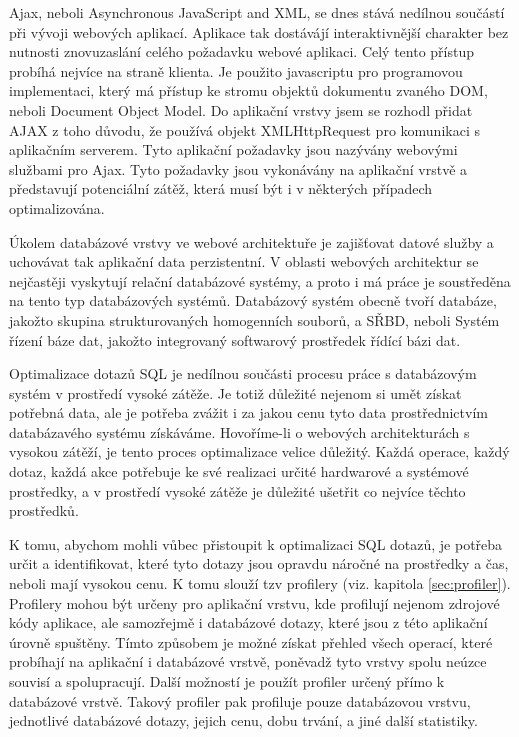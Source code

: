 \documentclass[12pt]{article}
\begin{document}
Ajax, neboli Asynchronous JavaScript and XML, se dnes stává nedílnou součástí při vývoji webových aplikací. Aplikace tak dostávájí interaktivnější charakter bez nutnosti znovuzaslání celého požadavku webové aplikaci. Celý tento přístup probíhá nejvíce na straně klienta. Je použito javascriptu pro programovou implementaci, který má přístup ke stromu objektů dokumentu zvaného DOM, neboli Document Object Model. Do aplikační vrstvy jsem se rozhodl přidat AJAX z toho důvodu, že používá objekt XMLHttpRequest pro komunikaci s aplikačním serverem. Tyto aplikační požadavky jsou nazývány webovými službami pro Ajax. Tyto požadavky jsou vykonávány na aplikační vrstvě a představují potenciální zátěž, která musí být i v některých případech optimalizována.\cite{ajax}




Úkolem databázové vrstvy ve webové architektuře je zajišťovat datové služby a uchovávat tak aplikační data perzistentní. V oblasti webových architektur se nejčastěji vyskytují relační databázové systémy, a proto i má práce je soustředěna na tento typ databázových systémů. Databázový systém obecně tvoří databáze, jakožto skupina strukturovaných homogenních souborů, a SŘBD, neboli Systém řízení báze dat, jakožto integrovaný softwarový prostředek řídící bázi dat.

Optimalizace dotazů SQL je nedílnou součásti procesu práce s databázovým systém v prostředí vysoké zátěže. Je totiž důležité nejenom si umět získat potřebná data, ale je potřeba zvážit i za jakou cenu tyto data prostřednictvím databázavého systému získáváme. Hovoříme-li o webových architekturách s vysokou zátěží, je tento proces optimalizace velice důležitý. Každá operace, každý dotaz, každá akce potřebuje ke své realizaci určité hardwarové a systémové prostředky, a v prostředí vysoké zátěže je důležité ušetřit co nejvíce těchto prostředků.

K tomu, abychom mohli vůbec přistoupit k optimalizaci SQL dotazů, je potřeba určit a identifikovat, které tyto dotazy jsou opravdu náročné na prostředky a čas, neboli mají vysokou cenu. K tomu slouží tzv profilery (viz. kapitola \ref{sec:profiler}). Profilery mohou být určeny pro aplikační vrstvu, kde profilují nejenom zdrojové kódy aplikace, ale samozřejmě i databázové dotazy, které jsou z této aplikační úrovně spuštěny. Tímto způsobem je možné získat přehled všech operací, které probíhají na aplikační i databázové vrstvě, poněvadž tyto vrstvy spolu neúzce souvisí a spolupracují. Další možností je použít profiler určený přímo k databázové vrstvě. Takový profiler pak profiluje pouze databázovou vrstvu, jednotlivé databázové dotazy, jejich cenu, dobu trvání, a jiné další statistiky.
\end{document}
